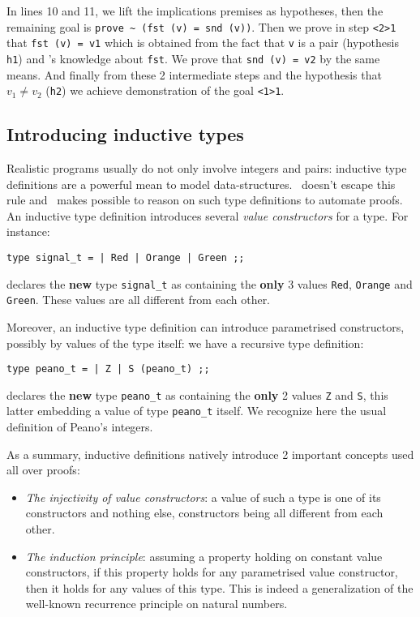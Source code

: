 \documentclass[11pt,a4paper,twoside,onecolumn,fullpage]{article}
\begin{document}
{\scriptsize
}

In lines 10 and 11, we lift the implications premises as hypotheses,
then the re\-mai\-ning goal is \lstinline"prove ~ (fst (v) = snd (v))".
Then we prove in step \lstinline"<2>1" that \lstinline"fst (v) = v1"
which is obtained from the fact that \lstinline"v" is a pair (hypothesis
\lstinline"h1") and \zenon's knowledge about \lstinline"fst". We prove
that \lstinline"snd (v) = v2" by the same means. And finally from
these 2 intermediate steps and the hypothesis that $v_1 \not = v_2$
(\lstinline"h2") we achieve demonstration of the goal \lstinline"<1>1".


\subsection{Introducing inductive types}

Realistic programs usually do not only involve integers and pairs:
inductive type de\-fi\-ni\-tions are a powerful mean to model
data-structures. \focal\ doesn't escape this rule and \zenon\ makes
possible to reason on such type definitions to automate
proofs.
An inductive type definition introduces several {\em value constructors} for a type.
For instance:

{\scriptsize
\begin{lstlisting}
type signal_t = | Red | Orange | Green ;;
\end{lstlisting}}

\noindent declares the {\bf new} type \lstinline"signal_t" as containing the
{\bf only} 3 values \lstinline"Red", \lstinline"Orange" and
\lstinline"Green". These values are all different from each other.

Moreover, an inductive type definition can introduce parametrised
constructors, possibly by values of the type itself: we have a recursive
type definition:

{\scriptsize
\begin{lstlisting}
type peano_t = | Z | S (peano_t) ;;
\end{lstlisting}}

\noindent declares the {\bf new} type \lstinline"peano_t" as containing the
{\bf only} 2 values \lstinline"Z" and \lstinline"S", this latter
embedding a value of type \lstinline"peano_t" itself. We recognize
here the usual definition of Peano's integers.

\medskip
As a summary, inductive definitions natively introduce 2 important
concepts used all over proofs:
\begin{itemize}
\item {\em The injectivity of value constructors}: a value of such a type is
  one of its cons\-truc\-tors and nothing else, constructors being all
  different from each other.
\item {\em The induction principle}: assuming a property holding on constant
  value constructors, if this property holds for any parametrised
  value constructor, then it holds for any values of this type. This is
  indeed a generalization of the well-known recurrence principle on
  natural numbers.
\end{itemize}
\end{document}
